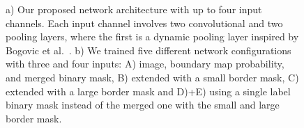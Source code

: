 \begin{figure}[t]
 \centering
    \hfill
	\caption{ a) Our proposed network architecture with up to four input channels. Each input channel involves two convolutional and two pooling layers, where the first is a dynamic pooling layer inspired by Bogovic et al.~\cite{BogovicHJ13}. b) We trained five different network configurations with three and four inputs: A) image, boundary map probability, and merged binary mask, B) extended with a small border mask, C) extended with a large border mask and D)+E) using a single label binary mask instead of the merged one with the small and large border mask.}
\end{figure}
%  


